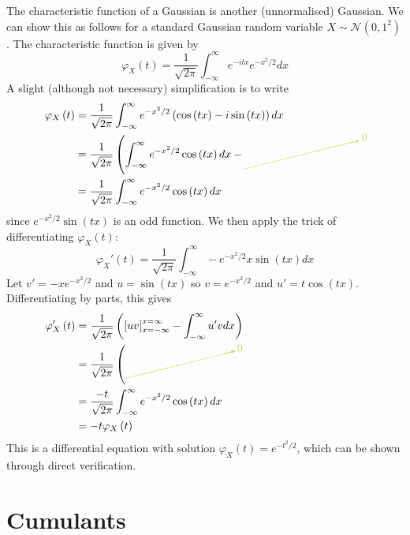 \documentclass[11pt]{report} %
\begin{document}
The characteristic function of a Gaussian is another (unnormalised) Gaussian. We can show this as follows for a standard Gaussian random variable $X \sim \mathcal{N}\left(0, 1^{2}\right)$. The characteristic function is given by
\begin{equation}
\varphi_{X}\left(t\right) = \dfrac{1}{\sqrt{2\pi}}\int_{-\infty}^{\infty}e^{-itx}e^{-x^{2}/2}dx
\end{equation}
A slight (although not necessary) simplification is to write
\begin{align}
\varphi_{X}\left(t\right) &= \dfrac{1}{\sqrt{2\pi}}\int_{-\infty}^{\infty}e^{-x^{2}/2}\left(\cos\left(tx\right) - i\sin\left(tx\right)\right)dx \\
&= \dfrac{1}{\sqrt{2\pi}}\left(\int_{-\infty}^{\infty}e^{-x^{2}/2}\cos\left(tx\right)dx - \green\cancelto{0}{\black i\int_{-\infty}^{\infty}e^{-x^{2}/2}\sin\left(tx\right)dx}\black\right) \\
&= \dfrac{1}{\sqrt{2\pi}}\int_{-\infty}^{\infty}e^{-x^{2}/2}\cos\left(tx\right)dx
\end{align}
since $e^{-x^{2}/2}\sin\left(tx\right)$ is an odd function. We then apply the trick of differentiating $\varphi_{X}\left(t\right)$:
\begin{equation}
\varphi_{X}'\left(t\right) = \dfrac{1}{\sqrt{2\pi}}\int_{-\infty}^{\infty}-e^{-x^{2}/2}x\sin\left(tx\right)dx
\end{equation}
Let $v' = -xe^{-x^{2}/2}$ and $u = \sin\left(tx\right)$ so $v = e^{-x^{2}/2}$ and $u' = t\cos\left(tx\right)$. Differentiating by parts, this gives
\begin{align}
\varphi_{X}'\left(t\right) &= \dfrac{1}{\sqrt{2\pi}}\left(\left[uv\right]_{x = -\infty}^{x = \infty} - \int_{-\infty}^{\infty}u'vdx\right) \\
&= \dfrac{1}{\sqrt{2\pi}}\left(\green\cancelto{0}{\black\left[e^{-x^{2}/2}\sin\left(tx\right)\right]_{x = -\infty}^{x = \infty}}\black - \int_{-\infty}^{\infty}t\cos\left(tx\right)e^{-x^{2}/2}dx\right) \\
&=  \dfrac{-t}{\sqrt{2\pi}}\int_{-\infty}^{\infty}e^{-x^{2}/2}\cos\left(tx\right)dx \\
&= -t\varphi_{X}\left(t\right)
\end{align}
This is a differential equation with solution $\varphi_{X}\left(t\right) = e^{-t^{2}/2}$, which can be shown through direct verification.

\section{Cumulants}
\end{document}
